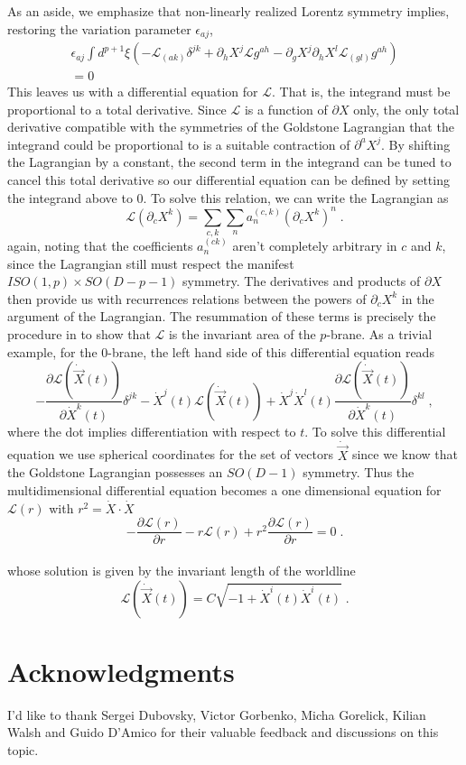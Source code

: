 \documentclass[%
 reprint,
 amsmath,amssymb,
 aps,
]{revtex4-1}
\begin{document}
As an aside, we emphasize that non-linearly realized Lorentz symmetry implies, restoring the variation parameter $\epsilon_{a j}$,
\begin{eqnarray}
    \epsilon_{a j} \int d^{p+1} \xi \left(
    -\mathcal{L}_{(a k)} \delta^{j k}
    + \partial_h X^j \mathcal{L} g^{a h}
    - \partial_g X^j \partial_h X^l \mathcal{L}_{(g l)} g^{a h} \right) \nonumber \\
    = 0 \nonumber
\end{eqnarray}
This leaves us with a differential equation for $\mathcal{L}$. That is, the integrand must be
proportional to a total derivative. Since $\mathcal{L}$ is a function of
$\partial X$ only, the only total derivative compatible with the symmetries of the Goldstone Lagrangian
that the integrand could be proportional to is a suitable contraction of $\partial^a X^j$. By shifting the
Lagrangian by a constant, the second term in the integrand can be tuned to cancel this total derivative so
our differential equation can be defined by setting the integrand above to 0.
To solve this relation, we can write the Lagrangian as
\begin{equation}
    \mathcal{L}(\partial_c X^k) = \sum_{c, k} \sum_n a^{(c, k)}_n (\partial_c X^k)^n \; . \nonumber
\end{equation}
again, noting that the coefficients $a_n^{(c k)}$ aren't completely arbitrary in $c$ and $k$, since the Lagrangian still must
respect the manifest $ISO(1,p) \times SO(D-p-1)$ symmetry. The derivatives and products of $\partial X$ then provide us with
recurrences relations between the powers of $\partial_c X^k$ in the argument of the Lagrangian. The resummation of these terms
is precisely the procedure in \cite{Gliozzi:2012cx} to show that $\mathcal{L}$ is the invariant area of the $p$-brane.
As a trivial example, for the $0$-brane, the left hand side of this differential equation reads
\begin{equation}
    -\frac{\partial \mathcal{L}(\dot{\vec{X}}(t) )}{\partial \dot{X}^k(t) } \delta^{jk} - \dot{X}^j(t) \mathcal{L}(\dot{\vec{X}}(t))
    + \dot{X}^j \dot{X}^l(t) \frac{\partial \mathcal{L}(\dot{\vec{X}}(t) )}{\partial \dot{X}^k(t)} \delta^{kl} \; , \nonumber
\end{equation}
where the dot implies differentiation with respect to $t$.  To solve this differential equation we use spherical coordinates for the
set of vectors $\dot{\vec{X}}$ since we know that the Goldstone Lagrangian possesses an $SO(D-1)$ symmetry.
Thus the multidimensional differential equation becomes a one dimensional equation for $\mathcal{L}(r)$ with $r^2 = \dot{X} \cdot \dot{X}$
\begin{equation}
    -\frac{\partial \mathcal{L}(r)}{\partial r} - r \mathcal{L}(r) + r^2 \frac{\partial \mathcal{L}(r)}{\partial r} = 0 \; . \nonumber
\end{equation}
\\
whose solution is given by the invariant length of the worldline
\begin{equation}
    \mathcal{L}(\dot{\vec{X}}(t)) = C \sqrt{-1 + \dot{X}^i(t) \dot{X}^i(t)} \; . \nonumber
\end{equation}

\section{Acknowledgments}
I'd like to thank Sergei Dubovsky, Victor Gorbenko, Micha Gorelick, Kilian Walsh and Guido D'Amico for their valuable feedback and discussions on this topic.


\end{document}
